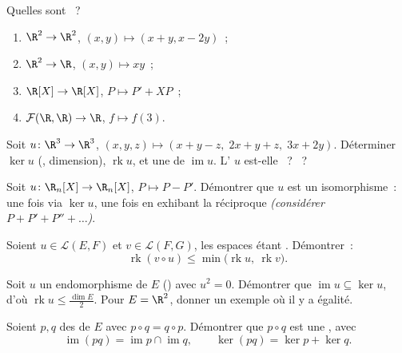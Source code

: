 \begin{exercise}[$\star$]\label{exo:b1:linmaps:1}
Quelles  sont ~?
\begin{enumerate}
  \item $\R^2 \to \R^2$, $(x, y) \mapsto (x + y, x - 2y)$~;
  \item $\R^2 \to \R$, $(x, y) \mapsto xy$~;
  \item $\R[X] \to \R[X]$, $P \mapsto P' + XP$~;
  \item $\mathcal{F}(\R,\R) \to \R$, $f \mapsto f(3)$.
\end{enumerate}
\end{exercise}

\begin{exercise}[$\star$]\label{exo:b1:linmaps:2}
Soit $u \colon \R^3 \to \R^3$, $(x,y,z) \mapsto (x + y - z,\; 2x + y
+ z,\; 3x + 2y)$. Déterminer $\ker u$ (, dimension),
$\operatorname{rk} u$, et une  de $\operatorname{im} u$. L' $u$
est-elle ~? ~?
\end{exercise}

\begin{exercise}[$\star$]\label{exo:b1:linmaps:3}
Soit $u \colon \R_n[X] \to \R_n[X]$, $P \mapsto P - P'$. Démontrer que
$u$ est un isomorphisme~: une fois via $\ker u$, une fois en exhibant la
réciproque \emph{(considérer $P + P' + P'' + \dots$)}.
\end{exercise}

\begin{exercise}[$\star$]\label{exo:b1:linmaps:4}
Soient $u \in \mathcal{L}(E, F)$ et $v \in \mathcal{L}(F, G)$, les espaces
étant . Démontrer~:
\[
\operatorname{rk}(v \circ u) \leq
\min\bigl(\operatorname{rk} u,\ \operatorname{rk} v\bigr).
\]
\end{exercise}

\begin{exercise}[$\star\star$]\label{exo:b1:linmaps:5}
Soit $u$ un endomorphisme de $E$ () avec $u^2 =
0$. Démontrer que $\operatorname{im} u \subseteq \ker u$, d'où
$\operatorname{rk} u \leq \frac{\dim E}{2}$. Pour $E = \R^2$, donner un
exemple où il y a égalité.
\end{exercise}

\begin{exercise}[$\star\star$]\label{exo:b1:linmaps:6}
Soient $p, q$ des  de $E$ avec $p \circ q = q \circ p$.
Démontrer que $p \circ q$ est une , avec
\[
\operatorname{im}(pq) = \operatorname{im} p \cap \operatorname{im}
q ,
\qquad
\ker (pq) = \ker p + \ker q .
\]
\end{exercise}

